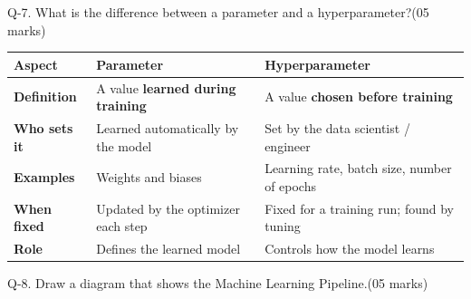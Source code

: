 \documentclass[11pt,a4paper]{article}
\newcommand{\question}[2]{%
  \begin{qbox}#1\hfill\textcolor{accent}{(05 marks)}\\[2pt]#2\end{qbox}%
}
\begin{document}
\question{Q-7. What is the difference between a parameter and a hyperparameter?}{}

\begin{center}
\begin{tabular}{@{}>{\bfseries}p{3.0cm}p{5.0cm}p{5.0cm}@{}}
\toprule
\rowcolor{primary!15}
\textbf{Aspect} & \textbf{Parameter} & \textbf{Hyperparameter} \\
\midrule
Definition & A value \textbf{learned during training} & A value \textbf{chosen before training} \\
Who sets it & Learned automatically by the model & Set by the data scientist / engineer \\
Examples & Weights and biases & Learning rate, batch size, number of epochs \\
When fixed & Updated by the optimizer each step & Fixed for a training run; found by tuning \\
Role & Defines the learned model & Controls how the model learns \\
\bottomrule
\end{tabular}
\end{center}

\question{Q-8. Draw a diagram that shows the Machine Learning Pipeline.}{}
\end{document}
